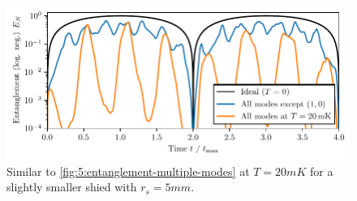 \begin{figure}
  \centering
  \includegraphics[width=\textwidth]{./../figures/vibrations/entanglement-multiple-modes_rs-5mm.pdf}
  \caption{Similar to \cref{fig:5:entanglement-multiple-modes} at $T=20\si{mK}$ for a slightly smaller shied with $r_s = 5\si{mm}$.}
  \label{fig:apx:entanglement-thermal-shield-rs-5mm}
\end{figure}
